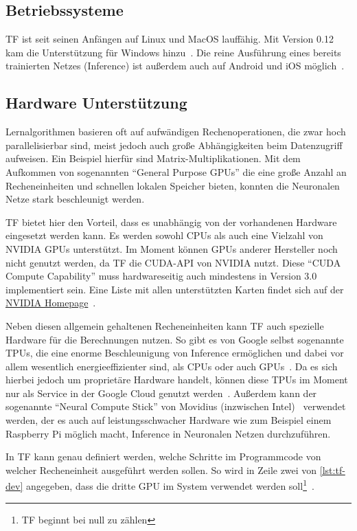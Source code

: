 \subsection{Betriebssysteme}
\gls{TF} ist seit seinen Anfängen auf Linux und MacOS lauffähig. Mit Version 0.12 kam die Unterstützung für Windows hinzu~\cite{tfRelease}. Die reine Ausführung eines bereits trainierten Netzes (Inference) ist außerdem auch auf Android und iOS möglich~\cite{tensorflow2015-whitepaper}\cite{tensorflow2016-whitepaper}.

\subsection{Hardware Unterstützung}
Lernalgorithmen basieren oft auf aufwändigen Rechenoperationen, die zwar hoch parallelisierbar sind, meist jedoch auch große Abhängigkeiten beim Datenzugriff aufweisen. Ein Beispiel hierfür sind Matrix-Multiplikationen. Mit dem Aufkommen von sogenannten "`General Purpose GPUs"' die eine große Anzahl an Recheneinheiten und schnellen lokalen Speicher bieten, konnten die Neuronalen Netze stark beschleunigt werden.

\gls{TF} bietet hier den Vorteil, dass es unabhängig von der vorhandenen Hardware eingesetzt werden kann. Es werden sowohl CPUs als auch eine Vielzahl von NVIDIA GPUs unterstützt. Im Moment können GPUs anderer Hersteller noch nicht genutzt werden, da \gls{TF} die CUDA-API von NVIDIA nutzt. Diese "`CUDA Compute Capability"' muss hardwareseitig auch mindestens in Version 3.0 implementiert sein. Eine Liste mit allen unterstützten Karten findet sich auf der \href{https://developer.nvidia.com/cuda-gpus}{NVIDIA Homepage}~\cite{tfinstall}.

Neben diesen allgemein gehaltenen Recheneinheiten kann \gls{TF} auch spezielle Hardware für die Berechnungen nutzen. So gibt es von Google selbst sogenannte \glspl{TPU}, die eine enorme Beschleunigung von Inference ermöglichen und dabei vor allem wesentlich energieeffizienter sind, als CPUs oder auch GPUs~\cite{TPU}. Da es sich hierbei jedoch um proprietäre Hardware handelt, können diese \glspl{TPU} im Moment nur als Service in der Google Cloud genutzt werden~\cite{TPU2}. Außerdem kann der sogenannte "`Neural Compute Stick"' von Movidius (inzwischen Intel)~\cite{movidius} verwendet werden, der es auch auf leistungsschwacher Hardware wie zum Beispiel einem Raspberry Pi möglich macht, Inference in Neuronalen Netzen durchzuführen.

In \gls{TF} kann genau definiert werden, welche Schritte im Programmcode von welcher Recheneinheit ausgeführt werden sollen. So wird in Zeile zwei von \autoref{lst:tf-dev} angegeben, dass die dritte GPU im System verwendet werden soll\footnote{\gls{TF} beginnt bei null zu zählen}~\cite{tf-dev}.


